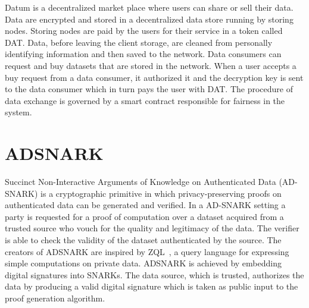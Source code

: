 Datum is a decentralized market place where users can share or sell their data. Data are encrypted and stored in a decentralized data store running by storing nodes. Storing nodes are paid by the users for their service in a token called DAT. Data, before leaving the client storage, are cleaned from personally identifying information and then saved to the network. Data consumers can request and buy datasets that are stored in the network. When a user accepts a buy request from a data consumer, it authorized it and the decryption key is sent to the data consumer which in turn pays the user with DAT. The procedure of data exchange is governed by a smart contract responsible for fairness in the system.

\section{ADSNARK}
\label{rel_work:adsnark}

Succinct Non-Interactive Arguments of Knowledge on Authenticated Data (AD-SNARK) is a cryptographic primitive in which privacy-preserving proofs on authenticated data can be generated and verified. In a AD-SNARK setting a party is requested for a proof of computation over a dataset acquired from a trusted source who vouch for the quality and legitimacy of the data. The verifier is able to check the validity of the dataset authenticated by the source. The creators of ADSNARK are inspired by ZQL~\cite{zql}, a query language for expressing simple computations on private data. ADSNARK is achieved by embedding digital signatures into SNARKs. The data source, which is trusted, authorizes the data by producing a valid digital signature which is taken as public input to the proof generation algorithm.
